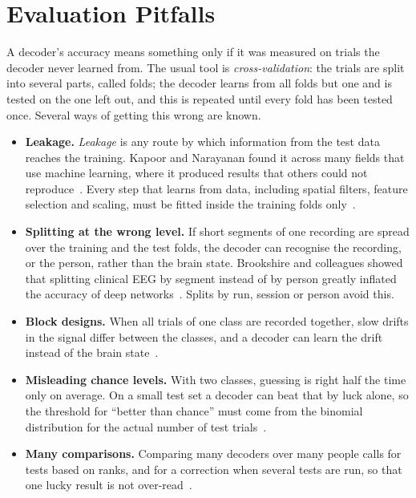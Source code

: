 \section{Evaluation Pitfalls}\label{sec:lit-pitfalls}

A decoder's accuracy means something only if it was measured on trials the decoder never
learned from. The usual tool is \emph{cross-validation}: the trials are split into several
parts, called folds; the decoder learns from all folds but one and is tested on the one left
out, and this is repeated until every fold has been tested once. Several ways of getting
this wrong are known.

\begin{itemize}
  \item \textbf{Leakage.} \emph{Leakage} is any route by which information from the test data
        reaches the training. Kapoor and Narayanan found it across many fields that use
        machine learning, where it produced results that others could not
        reproduce~\cite{kapoor2023}. Every step that learns from data, including spatial
        filters, feature selection and scaling, must be fitted inside the training folds
        only~\cite{varoquaux2017,lemm2011}.
  \item \textbf{Splitting at the wrong level.} If short segments of one recording are spread
        over the training and the test folds, the decoder can recognise the recording, or the
        person, rather than the brain state. Brookshire and colleagues showed that splitting
        clinical EEG by segment instead of by person greatly inflated the accuracy of deep
        networks~\cite{brookshire2024}. Splits by run, session or person avoid this.
  \item \textbf{Block designs.} When all trials of one class are recorded together, slow
        drifts in the signal differ between the classes, and a decoder can learn the drift
        instead of the brain state~\cite{li2021perils}.
  \item \textbf{Misleading chance levels.} With two classes, guessing is right half the time
        only on average. On a small test set a decoder can beat that by luck alone, so the
        threshold for ``better than chance'' must come from the binomial distribution for the
        actual number of test trials~\cite{combrisson2015}.
  \item \textbf{Many comparisons.} Comparing many decoders over many people calls for tests
        based on ranks, and for a correction when several tests are run, so that one lucky
        result is not over-read~\cite{demsar2006}.
\end{itemize}

